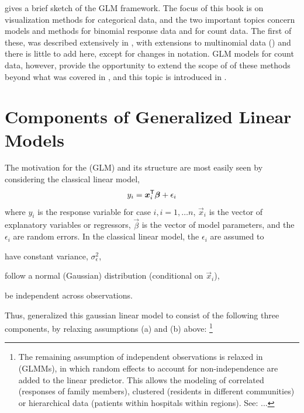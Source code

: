 \documentclass[11pt]{book}\usepackage[]{graphicx}\usepackage[]{color}
\begin{document}
 gives a brief sketch of the GLM framework.
The focus of this book is on visualization methods for categorical
data, and the two important topics concern models and methods for binomial response data
and for count data.  The first of these, 
was described extensively in
, 
with extensions to multinomial
data ()
and there is little to add here, except for changes
in notation.
GLM models for count data, however, provide the opportunity to extend 
the scope of of these methods beyond what was covered in ,
and this topic is introduced in .



\section{Components of Generalized Linear Models}\label{glm:components}

The motivation for the  (GLM) and its structure are most
easily seen by considering the classical linear model,
\begin{equation*}
y_i = \bm{x}_i^\mathsf{T} \bm{\beta} + \epsilon_i
\end{equation*}
where 
$y_i$ is the response variable for case $i, i=1, \dots n$,
$\vec{x}_i$ is the vector of explanatory variables or regressors, 
$\vec{\beta}$ is the vector of model parameters, and the
$\epsilon_i$ are random errors.
In the classical linear model, the $\epsilon_i$ are assumed to
\begin{seriate}
  \item have constant variance, $\sigma^2_\epsilon$,
  \item follow a normal (Gaussian) distribution (conditional on $\vec{x}_i$),
  \item be independent across observations.
\end{seriate}

Thus, \citet{NelderWedderburn:72} generalized this gaussian linear model to
consist of the following three components, by relaxing assumptions (a) and (b) above:%
\footnote{The remaining assumption of independent observations is relaxed in
 (GLMMs), in which random effects to account for non-independence
are added to the linear predictor.
This allows the modeling of correlated (responses of family members), clustered (residents in 
different communities)
or hierarchical data
(patients within hospitals within regions). See: \citet{McCullochNeuhaus:2005} ...
}
\end{document}
